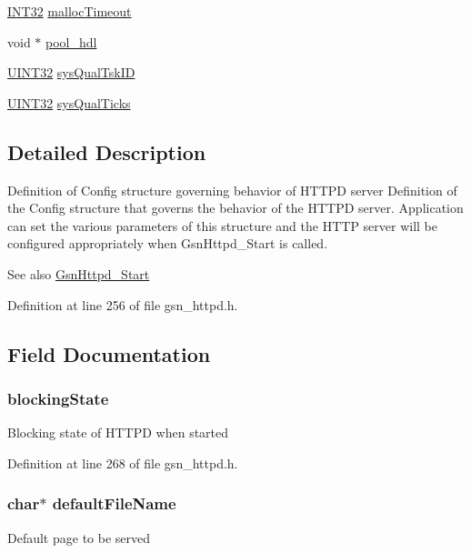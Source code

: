 \begin{DoxyCompactItemize}
\item 
\hyperlink{a00660_ga63021d67d54286c2163bcdb43a6f2569}{INT32} \hyperlink{a00095_a9f7ab5e13d82c9b5312c3c3e3dd1dd19}{mallocTimeout}
\item 
void $\ast$ \hyperlink{a00095_aa151e2a38086b90e2c33abce22b78e84}{pool\_\-hdl}
\item 
\hyperlink{a00660_gae1e6edbbc26d6fbc71a90190d0266018}{UINT32} \hyperlink{a00095_a3e06cb8fa58f49b7004a85c6f387ddc7}{sysQualTskID}
\item 
\hyperlink{a00660_gae1e6edbbc26d6fbc71a90190d0266018}{UINT32} \hyperlink{a00095_a3b8eb219c70a5f7fc6dcb9d9643cbc31}{sysQualTicks}
\end{DoxyCompactItemize}


\subsection{Detailed Description}
Definition of Config structure governing behavior of HTTPD server Definition of the Config structure that governs the behavior of the HTTPD server. Application can set the various parameters of this structure and the HTTP server will be configured appropriately when GsnHttpd\_\-Start is called. 

\begin{DoxySeeAlso}{See also}
\hyperlink{a00666_gae82a556385532a5c373c2c9700fa0959}{GsnHttpd\_\-Start} 
\end{DoxySeeAlso}


Definition at line 256 of file gsn\_\-httpd.h.



\subsection{Field Documentation}
\hypertarget{a00095_a770ddf3431339a8557a2c034d96a7a6d}{
\subsubsection[{blockingState}]{ {\bf blockingState}}}
\label{a00095_a770ddf3431339a8557a2c034d96a7a6d}
Blocking state of HTTPD when started 

Definition at line 268 of file gsn\_\-httpd.h.

\hypertarget{a00095_a7d978795357c23a14bc0c4b22767a9c8}{
\subsubsection[{defaultFileName}]{\setlength{\rightskip}{0pt plus 5cm}char$\ast$ {\bf defaultFileName}}}
\label{a00095_a7d978795357c23a14bc0c4b22767a9c8}
Default page to be served 


